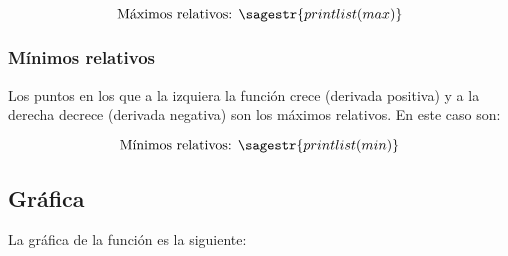 \[\text{Máximos relativos: } \sagestr{printlist(max)}\]

\subsubsection{Mínimos relativos}
Los puntos en los que a la izquiera la función crece (derivada positiva) y a la derecha decrece (derivada negativa) son los máximos relativos. En este caso son: 

\[\text{Mínimos relativos: }\sagestr{printlist(min)}\]



\subsection{Gráfica}

La gráfica de la función es la siguiente:

